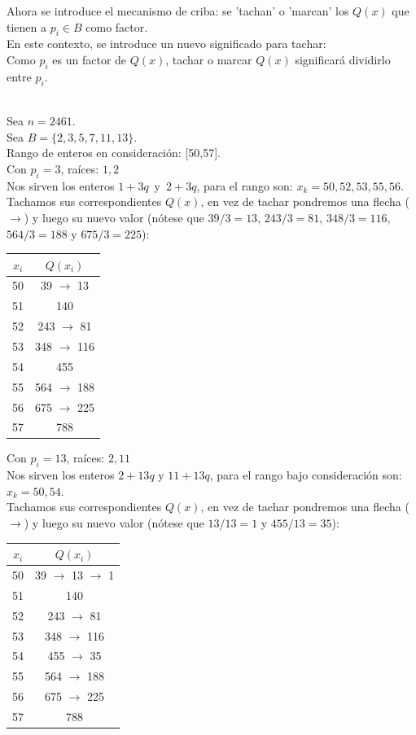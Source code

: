 Ahora se introduce el mecanismo de criba: se 'tachan' o 'marcan' los $Q(x)$ que tienen a $p_i \in B$ como factor. \\
En este contexto, se introduce un nuevo significado para tachar: \\
Como $p_i$ es un factor de $Q(x)$, tachar o marcar $Q(x)$ significará dividirlo entre $p_i$. \\

\begin{ejemplo} \, \\
Sea $n = 2461$. \\
Sea $B = \{2, 3, 5, 7, 11,13\}$. \\
Rango de enteros en consideración: [50,57]. \\
Con $p_i= 3$, raíces: $1,2$ \\
Nos sirven los enteros $1+3q \,$ y $\, 2+3q$, para el rango son: $x_k=50, 52, 53, 55, 56$. \\
Tachamos sus correspondientes $Q(x)$, en vez de tachar pondremos una flecha ($\rightarrow$) y luego su nuevo valor (nótese que $39/3=13$, $243/3=81$, $348/3=116$, $564/3=188$ y $675/3=225$): \\
\begin{tabular}{|c|c|}
\hline
$x_i$ & $Q(x_i)$ \\
\hline
50 & 39 $\rightarrow$ 13 \\
51 & 140 \\
52 & 243 $\rightarrow$ 81 \\
53 & 348 $\rightarrow$ 116 \\
54 & 455 \\
55 & 564 $\rightarrow$ 188 \\
56 & 675 $\rightarrow$ 225 \\
57 & 788 \\
\hline
\end{tabular}

Con $p_i= 13$, raíces: $2,11$ \\
Nos sirven los enteros $2+13q$ y $11+13q$, para el rango bajo consideración son: $x_k=50,54$. \\
Tachamos sus correspondientes $Q(x)$, en vez de tachar pondremos una flecha ($\rightarrow$) y luego su nuevo valor (nótese que $13 / 13=1$ y $455 / 13=35$): \\
\begin{tabular}{|c|c|}
\hline
$x_i$ & $Q(x_i)$ \\
\hline
50 & 39 $\rightarrow$ 13 $\rightarrow$ 1 \\
51 & 140 \\
52 & 243 $\rightarrow$ 81 \\
53 & 348 $\rightarrow$ 116 \\
54 & 455 $\rightarrow$ 35 \\
55 & 564 $\rightarrow$ 188 \\
56 & 675 $\rightarrow$ 225 \\
57 & 788 \\
\hline
\end{tabular}


\end{ejemplo}
